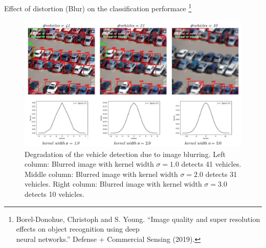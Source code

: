 \documentclass{libs/ufc_format}
\begin{document}
\begin{frame}{\small Effect of distortion (Blur) on the classification performace \footnote[frame]{\tiny Borel-Donohue, Christoph and S. Young. “Image quality and super resolution effects on object recognition using deep \\ neural networks.” Defense + Commercial Sensing (2019).}}
    \begin{figure}
        \centering
        \includegraphics[scale=0.2]{libs/blureffect.png}
        \caption{Degradation of the vehicle detection due to image blurring. Left column: Blurred image with kernel width $\sigma=1.0$ detects 41 vehicles. Middle column: Blurred image with kernel width $\sigma=2.0$ detects 31 vehicles. Right column: Blurred image with kernel width $\sigma=3.0$ detects 10 vehicles.}       
        \label{fig:challenge}
    \end{figure}

\end{frame}
\end{document}
